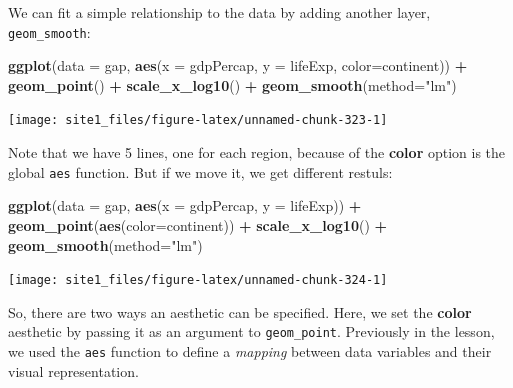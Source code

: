 \documentclass[]{book}
\newenvironment{Shaded}{\begin{snugshade}}{\end{snugshade}}
\newcommand{\KeywordTok}[1]{\textcolor[rgb]{0.13,0.29,0.53}{\textbf{#1}}}
\newcommand{\DataTypeTok}[1]{\textcolor[rgb]{0.13,0.29,0.53}{#1}}
\newcommand{\StringTok}[1]{\textcolor[rgb]{0.31,0.60,0.02}{#1}}
\newcommand{\OperatorTok}[1]{\textcolor[rgb]{0.81,0.36,0.00}{\textbf{#1}}}
\newcommand{\NormalTok}[1]{#1}
\begin{document}
We can fit a simple relationship to the data by adding another layer,
\texttt{geom\_smooth}:

\begin{Shaded}
\begin{Highlighting}[]
\KeywordTok{ggplot}\NormalTok{(}\DataTypeTok{data =}\NormalTok{ gap, }\KeywordTok{aes}\NormalTok{(}\DataTypeTok{x =}\NormalTok{ gdpPercap, }\DataTypeTok{y =}\NormalTok{ lifeExp, }\DataTypeTok{color=}\NormalTok{continent)) }\OperatorTok{+}\StringTok{ }
\StringTok{  }\KeywordTok{geom_point}\NormalTok{() }\OperatorTok{+}\StringTok{ }
\StringTok{  }\KeywordTok{scale_x_log10}\NormalTok{() }\OperatorTok{+}\StringTok{ }
\StringTok{  }\KeywordTok{geom_smooth}\NormalTok{(}\DataTypeTok{method=}\StringTok{"lm"}\NormalTok{)}
\end{Highlighting}
\end{Shaded}

\begin{center}\texttt{[image: site1\_files/figure-latex/unnamed-chunk-323-1]} \end{center}

Note that we have 5 lines, one for each region, because of the
\textbf{color} option is the global \texttt{aes} function. But if we
move it, we get different restuls:

\begin{Shaded}
\begin{Highlighting}[]
\KeywordTok{ggplot}\NormalTok{(}\DataTypeTok{data =}\NormalTok{ gap, }\KeywordTok{aes}\NormalTok{(}\DataTypeTok{x =}\NormalTok{ gdpPercap, }\DataTypeTok{y =}\NormalTok{ lifeExp)) }\OperatorTok{+}\StringTok{ }
\StringTok{  }\KeywordTok{geom_point}\NormalTok{(}\KeywordTok{aes}\NormalTok{(}\DataTypeTok{color=}\NormalTok{continent)) }\OperatorTok{+}\StringTok{ }
\StringTok{  }\KeywordTok{scale_x_log10}\NormalTok{() }\OperatorTok{+}\StringTok{ }
\StringTok{  }\KeywordTok{geom_smooth}\NormalTok{(}\DataTypeTok{method=}\StringTok{"lm"}\NormalTok{)}
\end{Highlighting}
\end{Shaded}

\begin{center}\texttt{[image: site1\_files/figure-latex/unnamed-chunk-324-1]} \end{center}

So, there are two ways an aesthetic can be specified. Here, we set the
\textbf{color} aesthetic by passing it as an argument to
\texttt{geom\_point}. Previously in the lesson, we used the \texttt{aes}
function to define a \emph{mapping} between data variables and their
visual representation.
\end{document}
